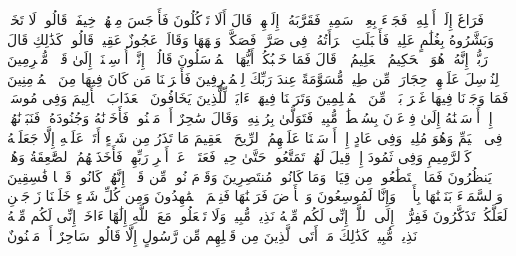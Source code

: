 \startbuffer[\q:51:26]
فَرَاغَ إِلَىٰۤ أَهۡلِهِۦ فَجَاۤءَ بِعِجۡلࣲ سَمِینࣲ%
\stopbuffer
\startbuffer[\q:51:27]
فَقَرَّبَهُۥۤ إِلَیۡهِمۡ قَالَ أَلَا تَأۡكُلُونَ%
\stopbuffer
\startbuffer[\q:51:28]
فَأَوۡجَسَ مِنۡهُمۡ خِیفَةࣰۖ قَالُوا۟ لَا تَخَفۡۖ وَبَشَّرُوهُ بِغُلَٰمٍ عَلِیمࣲ%
\stopbuffer
\startbuffer[\q:51:29]
فَأَقۡبَلَتِ ٱمۡرَأَتُهُۥ فِی صَرَّةࣲ فَصَكَّتۡ وَجۡهَهَا وَقَالَتۡ عَجُوزٌ عَقِیمࣱ%
\stopbuffer
\startbuffer[\q:51:30]
قَالُوا۟ كَذَٰلِكِ قَالَ رَبُّكِۖ إِنَّهُۥ هُوَ ٱلۡحَكِیمُ ٱلۡعَلِیمُ%
\stopbuffer
\startbuffer[\q:51:31]
۞ قَالَ فَمَا خَطۡبُكُمۡ أَیُّهَا ٱلۡمُرۡسَلُونَ%
\stopbuffer
\startbuffer[\q:51:32]
قَالُوۤا۟ إِنَّاۤ أُرۡسِلۡنَاۤ إِلَىٰ قَوۡمࣲ مُّجۡرِمِینَ%
\stopbuffer
\startbuffer[\q:51:33]
لِنُرۡسِلَ عَلَیۡهِمۡ حِجَارَةࣰ مِّن طِینࣲ%
\stopbuffer
\startbuffer[\q:51:34]
مُّسَوَّمَةً عِندَ رَبِّكَ لِلۡمُسۡرِفِینَ%
\stopbuffer
\startbuffer[\q:51:35]
فَأَخۡرَجۡنَا مَن كَانَ فِیهَا مِنَ ٱلۡمُؤۡمِنِینَ%
\stopbuffer
\startbuffer[\q:51:36]
فَمَا وَجَدۡنَا فِیهَا غَیۡرَ بَیۡتࣲ مِّنَ ٱلۡمُسۡلِمِینَ%
\stopbuffer
\startbuffer[\q:51:37]
وَتَرَكۡنَا فِیهَاۤ ءَایَةࣰ لِّلَّذِینَ یَخَافُونَ ٱلۡعَذَابَ ٱلۡأَلِیمَ%
\stopbuffer
\startbuffer[\q:51:38]
وَفِی مُوسَىٰۤ إِذۡ أَرۡسَلۡنَٰهُ إِلَىٰ فِرۡعَوۡنَ بِسُلۡطَٰنࣲ مُّبِینࣲ%
\stopbuffer
\startbuffer[\q:51:39]
فَتَوَلَّىٰ بِرُكۡنِهِۦ وَقَالَ سَٰحِرٌ أَوۡ مَجۡنُونࣱ%
\stopbuffer
\startbuffer[\q:51:40]
فَأَخَذۡنَٰهُ وَجُنُودَهُۥ فَنَبَذۡنَٰهُمۡ فِی ٱلۡیَمِّ وَهُوَ مُلِیمࣱ%
\stopbuffer
\startbuffer[\q:51:41]
وَفِی عَادٍ إِذۡ أَرۡسَلۡنَا عَلَیۡهِمُ ٱلرِّیحَ ٱلۡعَقِیمَ%
\stopbuffer
\startbuffer[\q:51:42]
مَا تَذَرُ مِن شَیۡءٍ أَتَتۡ عَلَیۡهِ إِلَّا جَعَلَتۡهُ كَٱلرَّمِیمِ%
\stopbuffer
\startbuffer[\q:51:43]
وَفِی ثَمُودَ إِذۡ قِیلَ لَهُمۡ تَمَتَّعُوا۟ حَتَّىٰ حِینࣲ%
\stopbuffer
\startbuffer[\q:51:44]
فَعَتَوۡا۟ عَنۡ أَمۡرِ رَبِّهِمۡ فَأَخَذَتۡهُمُ ٱلصَّٰعِقَةُ وَهُمۡ یَنظُرُونَ%
\stopbuffer
\startbuffer[\q:51:45]
فَمَا ٱسۡتَطَٰعُوا۟ مِن قِیَامࣲ وَمَا كَانُوا۟ مُنتَصِرِینَ%
\stopbuffer
\startbuffer[\q:51:46]
وَقَوۡمَ نُوحࣲ مِّن قَبۡلُۖ إِنَّهُمۡ كَانُوا۟ قَوۡمࣰا فَٰسِقِینَ%
\stopbuffer
\startbuffer[\q:51:47]
وَٱلسَّمَاۤءَ بَنَیۡنَٰهَا بِأَیۡی۟دࣲ وَإِنَّا لَمُوسِعُونَ%
\stopbuffer
\startbuffer[\q:51:48]
وَٱلۡأَرۡضَ فَرَشۡنَٰهَا فَنِعۡمَ ٱلۡمَٰهِدُونَ%
\stopbuffer
\startbuffer[\q:51:49]
وَمِن كُلِّ شَیۡءٍ خَلَقۡنَا زَوۡجَیۡنِ لَعَلَّكُمۡ تَذَكَّرُونَ%
\stopbuffer
\startbuffer[\q:51:50]
فَفِرُّوۤا۟ إِلَى ٱللَّهِۖ إِنِّی لَكُم مِّنۡهُ نَذِیرࣱ مُّبِینࣱ%
\stopbuffer
\startbuffer[\q:51:51]
وَلَا تَجۡعَلُوا۟ مَعَ ٱللَّهِ إِلَٰهًا ءَاخَرَۖ إِنِّی لَكُم مِّنۡهُ نَذِیرࣱ مُّبِینࣱ%
\stopbuffer
\startbuffer[\q:51:52]
كَذَٰلِكَ مَاۤ أَتَى ٱلَّذِینَ مِن قَبۡلِهِم مِّن رَّسُولٍ إِلَّا قَالُوا۟ سَاحِرٌ أَوۡ مَجۡنُونٌ%
